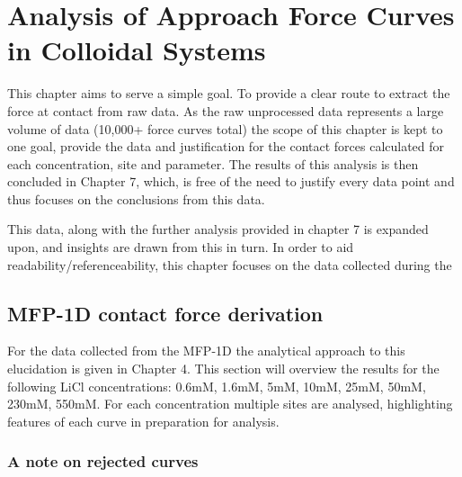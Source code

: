 


\chapter{Analysis of Approach Force Curves in Colloidal Systems}
\label{chap:approach_force_curves}

This chapter aims to serve a simple goal. To provide a clear route to extract the force at contact from raw data.  As the raw unprocessed data represents a large volume of data (10,000+ force curves total) the scope of this chapter is kept to one goal, provide the data and justification for the contact forces calculated for each concentration, site and parameter. The results of this analysis is then concluded in Chapter 7, which, is free of the need to justify every data point and thus focuses on the conclusions from this data. 

This data, along with the further analysis provided in chapter 7 is expanded upon, and insights are drawn from this in turn. In order to aid readability/referenceability, this chapter focuses on the data collected during the 

\section{MFP-1D contact force derivation}

For the data collected from the MFP-1D the analytical approach to this elucidation is given in Chapter 4. This section will overview the results for the following LiCl concentrations: 0.6mM, 1.6mM, 5mM, 10mM, 25mM, 50mM, 230mM, 550mM. For each concentration multiple sites are analysed, highlighting features of each curve in preparation for analysis. 

\subsection{A note on rejected curves}

